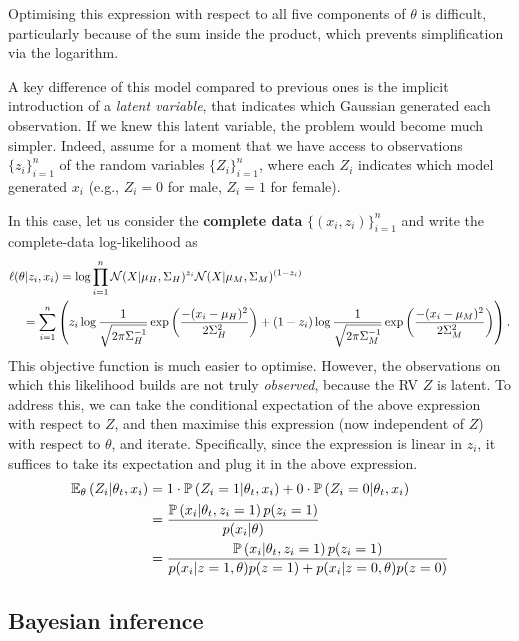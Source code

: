 Optimising this expression with respect to all five components of $\theta$ is difficult, particularly because of the sum inside the product, which prevents simplification via the logarithm.

A key difference of this model compared to previous ones is the implicit introduction of a \emph{latent variable}, that indicates which Gaussian generated each observation. If we knew this latent variable, the problem would become much simpler. Indeed, assume for a moment that we have access to observations $\{z_i\}_{i=1}^n$ of the random variables $\{Z_i\}_{i=1}^n$, where each $Z_i$ indicates which model generated $x_i$ (e.g., $Z_i = 0$ for male, $Z_i = 1$ for female).

In this case, let us consider the \textbf{complete data} $\{(x_i, z_i)\}_{i=1}^n$ and write the complete-data log-likelihood as
\begin{align*} 
\ell(\theta|z_i,x_i) &= \log\prod_{i=1}^n \cN(X|\mu_H,\Sigma_H)^{z_i} \cN(X|\mu_M,\Sigma_M)^{(1-z_i)}\\ 
&\hspace{-3em}= \sum_{i=1}^n \left( z_i\log\frac{1}{\sqrt{2\pi\Sigma_H^{-1}}}\expo{\frac{-(x_i-\mu_H)^2}{2\Sigma^2_H}} + (1-z_i)\log\frac{1}{\sqrt{2\pi\Sigma_M^{-1}}}\expo{\frac{-(x_i-\mu_M)^2}{2\Sigma^2_M}}\right). \end{align*}
This objective function is much easier to optimise. However, the observations on which this likelihood builds are not truly \emph{observed}, because the RV $Z$ is latent. To address this, we can take the conditional expectation of the above expression with respect to $Z$, and then maximise this expression (now independent of $Z$) with respect to $\theta$, and iterate. Specifically, since the expression is linear in $z_i$, it suffices to take its expectation and plug it in the above expression.
\begin{align*} 
\mathbb{E}_\theta \left(Z_i|\theta_t,x_i\right) &= 1\cdot\mathbb{P} \left(Z_i=1|\theta_t,x_i\right) + 0\cdot\mathbb{P} \left(Z_i=0|\theta_t,x_i\right)\\ 
&= \frac{\mathbb{P} \left(x_i|\theta_t,z_i=1\right) p(z_i=1)}{p(x_i|\theta)}\\ 
&= \frac{\mathbb{P} \left(x_i|\theta_t,z_i=1\right) p(z_i=1)}{p(x_i|z=1,\theta)p(z=1)+p(x_i|z=0 ,\theta)p(z=0)} \end{align*}


\subsection{Bayesian inference}

